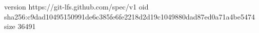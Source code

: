 version https://git-lfs.github.com/spec/v1
oid sha256:c9dad10495150991de6c385fe6fe2218d2d19c1049880dad87ed0a71a4be5474
size 36491
